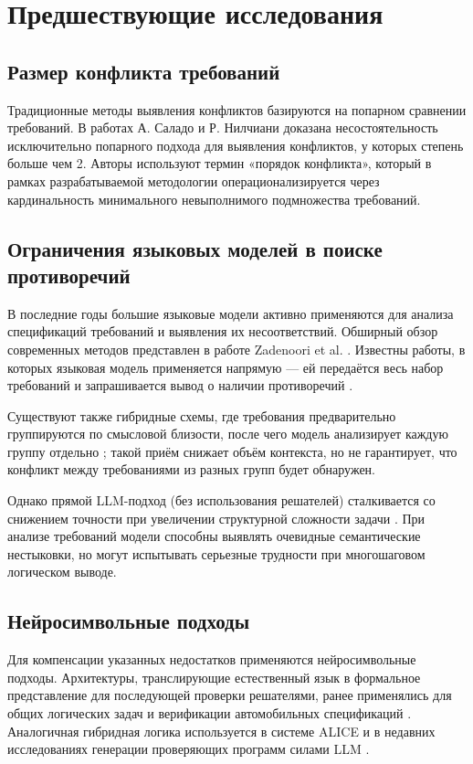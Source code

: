 \section{Предшествующие исследования}

\subsection{Размер конфликта требований}
Традиционные методы выявления конфликтов базируются на попарном сравнении требований. В работах А. Саладо и Р. Нилчиани \cite{salado2016order} доказана несостоятельность исключительно попарного подхода для выявления конфликтов, у которых степень больше чем 2. Авторы используют термин «порядок конфликта», который в рамках разрабатываемой методологии операционализируется через кардинальность минимального невыполнимого подмножества требований. 

\subsection{Ограничения языковых моделей в поиске противоречий}
В последние годы большие языковые модели активно применяются для анализа спецификаций требований и выявления их несоответствий. Обширный обзор современных методов представлен в работе Zadenoori et al. \cite{zadenoori2025llmre}. Известны работы, в которых языковая модель применяется напрямую — ей передаётся весь набор требований и запрашивается вывод о наличии противоречий \cite{fantechi2023chatgpt}. 

Существуют также гибридные схемы, где требования предварительно группируются по смысловой близости, после чего модель анализирует каждую группу отдельно \cite{fantechi2025inconsistency}; такой приём снижает объём контекста, но не гарантирует, что конфликт между требованиями из разных групп будет обнаружен.

Однако прямой LLM-подход (без использования решателей) сталкивается со снижением точности при увеличении структурной сложности задачи \cite{dziri2023compositionality}. При анализе требований модели способны выявлять очевидные семантические нестыковки, но могут испытывать серьезные трудности при многошаговом логическом выводе.

\subsection{Нейросимвольные подходы}
Для компенсации указанных недостатков применяются нейросимвольные подходы. Архитектуры, транслирующие естественный язык в формальное представление для последующей проверки решателями, ранее применялись для общих логических задач \cite{olausson2023linc, ye2023satlm} и верификации автомобильных спецификаций \cite{bertram2023consistency}. Аналогичная гибридная логика используется в системе ALICE \cite{gartner2024alice} и в недавних исследованиях генерации проверяющих программ силами LLM \cite{chen2025satisfiability}. 

